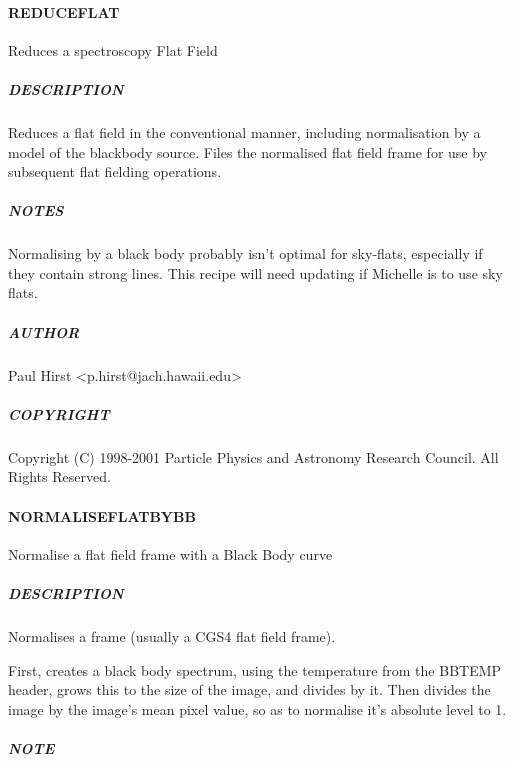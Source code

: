 \documentclass[twoside,11pt]{article}
\renewcommand{\_}{\texttt{\symbol{95}}}
\begin{document}
\paragraph*{REDUCE\_FLAT\label{REDUCE_FLAT}}

Reduces a spectroscopy Flat Field

\subparagraph*{DESCRIPTION\label{REDUCE_FLAT_DESCRIPTION}}

Reduces a flat field in the conventional manner, including
normalisation by a model of the blackbody source. Files the normalised
flat field frame for use by subsequent flat fielding operations.

\subparagraph*{NOTES\label{REDUCE_FLAT_NOTES}}

Normalising by a black body probably isn't optimal for sky-flats,
especially if they contain strong lines.
This recipe will need updating if Michelle is to use sky flats.

\subparagraph*{AUTHOR\label{REDUCE_FLAT_AUTHOR}}

Paul Hirst <p.hirst@jach.hawaii.edu>

\subparagraph*{COPYRIGHT\label{REDUCE_FLAT_COPYRIGHT}}

Copyright (C) 1998-2001 Particle Physics and Astronomy Research
Council. All Rights Reserved.


\paragraph*{\_NORMALISE\_FLAT\_BY\_BB\_\label{_NORMALISE_FLAT_BY_BB_}}

Normalise a flat field frame with a Black Body curve

\subparagraph*{DESCRIPTION\label{_NORMALISE_FLAT_BY_BB__DESCRIPTION}}

Normalises a frame (usually a CGS4 flat field frame).



First, creates a black body spectrum, using the temperature from the
BBTEMP header, grows this to the size of the image, and divides by
it. Then divides the image by the image's mean pixel value, so as to
normalise it's absolute level to 1.

\subparagraph*{NOTE\label{_NORMALISE_FLAT_BY_BB__NOTE}}
\end{document}
